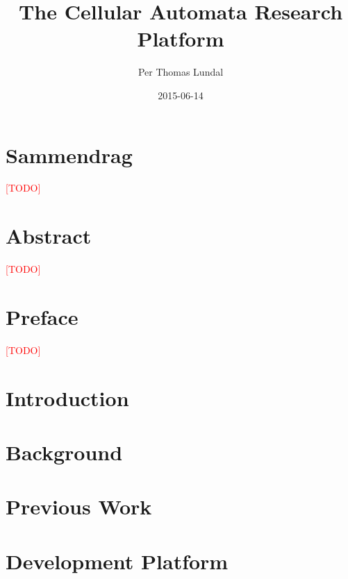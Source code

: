 \documentclass[a4paper]{report}
\title{
    {The Cellular Automata Research Platform}\\
    \TODO
}
\author{Per Thomas Lundal}
\date{2015-06-14}
\newcommand\TODO{\textcolor{red}{[TODO]}}
\begin{document}
\maketitle


\newpage
{}
{}
\chapter*{Sammendrag}
    \TODO

\newpage
{}
{}
\chapter*{Abstract}
    \TODO

\newpage
{}
{}
\chapter*{Preface}
    \TODO

\setcounter{tocdepth}{2}

\newpage
{}
{}
\tableofcontents

\newpage
{}
{}
\listoffigures

\newpage
{}
{}
\listoftables

\newpage


\chapter{Introduction}
    \label{ch:introduction}
    

\chapter{Background}
    \label{ch:background}
    

\chapter{Previous Work}
    \label{ch:previous-work}
    

\chapter{Development Platform}
    \label{ch:development-platform}
    
\end{document}
